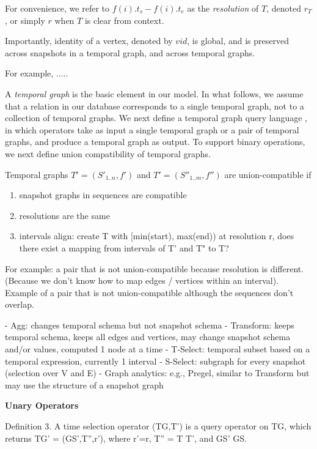\begin{itemize}
For convenience, we refer to $ f(i).t_s - f(i).t_e$ as the {\em
  resolution} of $T$, denoted $r_T$, or simply $r$ when $T$ is clear
from context.

Importantly, identity of a vertex, denoted by $vid$, is global, and is
preserved across snapshots in a temporal graph, and across temporal
graphs.

For example, ..... 

A {\em temporal graph} is the basic element in our model.  In what
follows, we assume that a relation in our database corresponds to a
single temporal graph, not to a collection of temporal graphs.  We
next define a temporal graph query language \ql, in which operators
take as input a single temporal graph or a pair of temporal graphs,
and produce a temporal graph as output.  To support binary operations,
we next define union compatibility of temporal graphs.

\begin{definition}
\label{def:tuc}
Temporal graphs $T' = (S'_{1..n}, f')$ and $T' = (S''_{1..m}, f'')$ are
union-compatible if
\begin{enumerate}
\item snapshot graphs in sequences are compatible
\item resolutions are the same
\item intervals align: create T with [min(start), max(end)) at
  resolution r, does there exist a mapping from intervals of T' and T"
  to T?
\end{enumerate}
\end{definition}

For example: a pair that is not union-compatible because resolution is
different. (Because we don't know how to map edges / vertices within
an interval).  Example of a pair that is not union-compatible although
the sequences don't overlap.

- Agg: changes temporal schema but not snapshot schema
- Transform: keeps temporal schema, keeps all edges and vertices, may change snapshot schema and/or values, computed 1 node at a time
- T-Select: temporal subset based on a temporal expression, currently 1 interval
- S-Select: subgraph for every snapshot (selection over V and E) 
- Graph analytics: e.g., Pregel, similar to Transform but may use the structure of a snapshot graph

{\bf Unary Operators}

Definition 3. A time selection operator \sigma(TG,T') is a query operator on TG, which returns TG' = (GS',T'',r'), where r'=r, T'' = T \cap T', and GS' \subseteq GS. 


\end{itemize}
